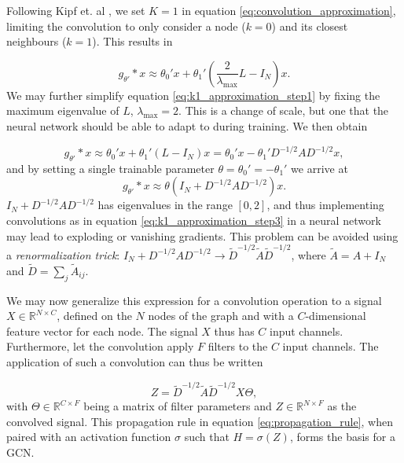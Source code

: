 Following Kipf et. al \cite{kipf_semi_supervised}, we set $K=1$ in equation \eqref{eq:convolution_approximation}, limiting the convolution to only consider a node ($k=0$) and its closest neighbours ($k=1$). This results in 

\begin{equation}
    g_{\theta'} * x \approx \theta_0' x + \theta_1' \left( \frac{2}{\lambda_{\text{max}}}L - I_N \right)x.
    \label{eq:k1_approximation_step1}
\end{equation}
We may further simplify equation \eqref{eq:k1_approximation_step1} by fixing the maximum eigenvalue of $L$, $\lambda_{\text{max}} = 2$. This is a change of scale, but one that the neural network should be able to adapt to during training. We then obtain

\begin{equation}
    g_{\theta'} * x \approx \theta_0' x + \theta_1' \left(L - I_N \right)x = \theta_0' x - \theta_1' D^{-1/2}AD^{-1/2}x ,
    \label{eq:k1_approximation_step2}
\end{equation}
and by setting a single trainable parameter $\theta = \theta_0' = -\theta_1'$ we arrive at 
\begin{equation}
    g_{\theta'} * x \approx \theta \left(I_N + D^{-1/2}AD^{-1/2} \right)x. 
    \label{eq:k1_approximation_step3}
\end{equation}
$I_N + D^{-1/2}AD^{-1/2}$ has eigenvalues in the range $[0, 2]$, and thus implementing convolutions as in equation \eqref{eq:k1_approximation_step3} in a neural network may lead to exploding or vanishing gradients. This problem can be avoided using a \textit{renormalization trick}: $I_N + D^{-1/2}AD^{-1/2} \rightarrow \tilde{D}^{-1/2} \tilde{A} \tilde{D}^{-1/2}$, where $\tilde{A} = A + I_N$ and $\tilde{D} = \sum_j \tilde{A}_{ij}$. 


We may now generalize this expression for a convolution operation to a signal $X \in \mathbb{R}^{N \times C}$, defined on the $N$ nodes of the graph and with a $C$-dimensional feature vector for each node. The signal $X$ thus has $C$ input channels. Furthermore, let the convolution apply $F$ filters to the $C$ input channels. The application of such a convolution can thus be written

\begin{equation}
    Z = \tilde{D}^{-1/2} \tilde{A} \tilde{D}^{-1/2} X \Theta,
    \label{eq:propagation_rule}
\end{equation}
with $\Theta \in \mathbb{R}^{C\times F}$ being a matrix of filter parameters and $Z \in \mathbb{R}^{N\times F}$ as the convolved signal. This propagation rule in equation \eqref{eq:propagation_rule}, when paired with an activation function $\sigma$ such that $H = \sigma\left(Z \right)$, forms the basis for a GCN. 

